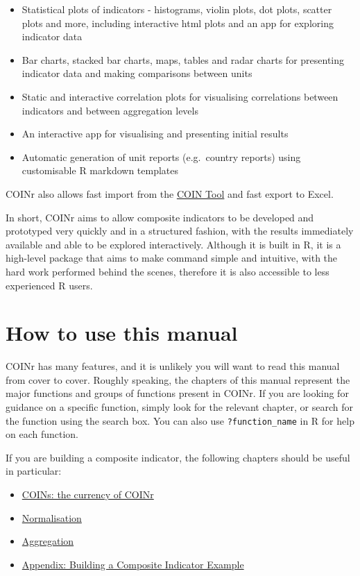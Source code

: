 \documentclass[
]{book}
\providecommand{\tightlist}{%
  \setlength{\itemsep}{0pt}\setlength{\parskip}{0pt}}
\begin{document}
\begin{itemize}
\tightlist
\item
  Statistical plots of indicators - histograms, violin plots, dot plots, scatter plots and more, including interactive html plots and an app for exploring indicator data
\item
  Bar charts, stacked bar charts, maps, tables and radar charts for presenting indicator data and making comparisons between units
\item
  Static and interactive correlation plots for visualising correlations between indicators and between aggregation levels
\item
  An interactive app for visualising and presenting initial results
\item
  Automatic generation of unit reports (e.g.~country reports) using customisable R markdown templates
\end{itemize}

COINr also allows fast import from the \href{https://knowledge4policy.ec.europa.eu/composite-indicators/coin-tool_en}{COIN Tool} and fast export to Excel.

In short, COINr aims to allow composite indicators to be developed and prototyped very quickly and in a structured fashion, with the results immediately available and able to be explored interactively. Although it is built in R, it is a high-level package that aims to make command simple and intuitive, with the hard work performed behind the scenes, therefore it is also accessible to less experienced R users.

\hypertarget{how-to-use-this-manual}{%
\section{How to use this manual}\label{how-to-use-this-manual}}

COINr has many features, and it is unlikely you will want to read this manual from cover to cover. Roughly speaking, the chapters of this manual represent the major functions and groups of functions present in COINr. If you are looking for guidance on a specific function, simply look for the relevant chapter, or search for the function using the search box. You can also use \texttt{?function\_name} in R for help on each function.

If you are building a composite indicator, the following chapters should be useful in particular:

\begin{itemize}
\tightlist
\item
  \protect\hyperlink{coins-the-currency-of-coinr}{COINs: the currency of COINr}
\item
  \protect\hyperlink{normalisation}{Normalisation}
\item
  \protect\hyperlink{aggregation}{Aggregation}
\item
  \protect\hyperlink{appendix-building-a-composite-indicator-example}{Appendix: Building a Composite Indicator Example}
\end{itemize}
\end{document}

